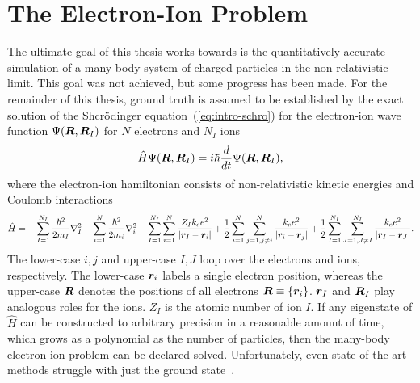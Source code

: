 \begin{comment}
Density matrix
\begin{align}
\rho\propto\exp\left(i\dfrac{S}{\hbar}\right)
\end{align}
\end{comment}

\section{The Electron-Ion Problem}
The ultimate goal of this thesis works towards is the quantitatively accurate simulation of a many-body system of charged particles in the non-relativistic limit.
This goal was not achieved, but some progress has been made.
For the remainder of this thesis, ground truth is assumed to be established by the exact solution of the Shcr\"odinger equation~(\ref{eq:intro-schro}) for the electron-ion wave function $\Psi(\boldsymbol{R},\boldsymbol{R}_I)$ for $N$ electrons and $N_I$ ions
\begin{align} \label{eq:intro-schro}
\hat{H} \Psi(\boldsymbol{R},\boldsymbol{R}_I) = i\hbar\frac{d}{dt}\Psi(\boldsymbol{R},\boldsymbol{R}_I),
\end{align}
where the electron-ion hamiltonian consists of non-relativistic kinetic energies and Coulomb interactions
\begin{align} \label{eq:intro-ei-ham}
\hat{H} =
-\sum\limits_{I=1}^{N_I} \frac{\hbar^2}{2m_I} \nabla^2_I
-\sum\limits_{i=1}^N \frac{\hbar^2}{2m_i}\nabla^2_i
-\sum\limits_{I=1}^{N_I}\sum\limits_{i=1}^N
\frac{Z_Ik_ee^2}{\vert\boldsymbol{r}_I-\boldsymbol{r}_i\vert}
+\frac{1}{2}\sum\limits_{i=1}^N\sum\limits_{j=1,j\neq i}^{N} \frac{k_ee^2}{\vert\boldsymbol{r}_i-\boldsymbol{r}_j\vert}
+\frac{1}{2}\sum\limits_{I=1}^{N_I}\sum\limits_{J=1,J\neq I}^{N_I} \frac{k_ee^2}{\vert\boldsymbol{r}_I-\boldsymbol{r}_J\vert}.
\end{align}
The lower-case $i,j$ and upper-case $I,J$ loop over the electrons and ions, respectively. The lower-case $\boldsymbol{r}_i$ labels a single electron position, whereas the upper-case $\boldsymbol{R}$ denotes the positions of all electrons $\boldsymbol{R}\equiv\{\boldsymbol{r}_i\}$. $\boldsymbol{r}_I$ and $\boldsymbol{R}_I$ play analogous roles for the ions. $Z_I$ is the atomic number of ion $I$. If any eigenstate of $\hat{H}$ can be constructed to arbitrary precision in a reasonable amount of time, which grows as a polynomial as the number of particles, then the many-body electron-ion problem can be declared solved. Unfortunately, even state-of-the-art methods struggle with just the ground state~\cite{Azadi2014,McMinis2015,Drummond2015}.

